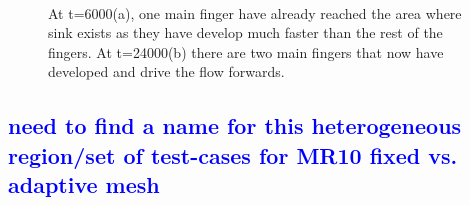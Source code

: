 \documentclass[preprint,authoryear,12pt]{elsarticle}
\newcommand{\blue}{\textcolor{blue}}
\begin{document}
\begin{figure}
\centering
{}\\[2mm]%
%
\caption{At t=6000(a), one main finger have already reached the area where sink exists as they have develop much faster than the rest of the fingers. At t=24000(b) there are two main fingers that now have developed and drive the flow forwards.}
\label{fig:3c_heteheleshaw_10}
\end{figure}


\subsection{\blue{need to find a name for this heterogeneous region/set of test-cases for MR10 fixed vs. adaptive mesh}}
\end{document}
